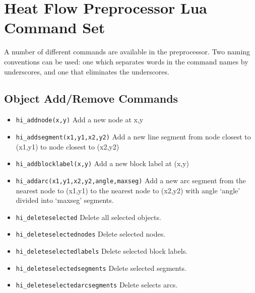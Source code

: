 
\section{Heat Flow Preprocessor Lua Command Set}

A number of different commands are available in the preprocessor.
Two naming conventions can be used: one which separates words in
the command names by underscores, and one that eliminates the
underscores.

\subsection{Object Add/Remove Commands}
\begin{itemize}
\item {\tt hi\_addnode(x,y)} Add a new node at x,y

\item {\tt hi\_addsegment(x1,y1,x2,y2)} Add a new line segment from node closest to
(x1,y1) to node closest to (x2,y2)

\item {\tt hi\_addblocklabel(x,y)} Add a new block label at (x,y)

\item {\tt hi\_addarc(x1,y1,x2,y2,angle,maxseg)} Add a new arc segment from the
nearest node to (x1,y1) to the nearest node to (x2,y2) with angle `angle'
divided into `maxseg' segments.

\item {\tt hi\_deleteselected} Delete all selected objects.

\item {\tt hi\_deleteselectednodes} Delete selected nodes.

\item {\tt hi\_deleteselectedlabels} Delete selected block labels.

\item {\tt hi\_deleteselectedsegments} Delete selected segments.

\item {\tt hi\_deleteselectedarcsegments} Delete selects arcs.
\end{itemize}



